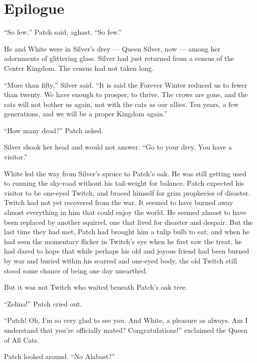 \documentclass[12pt]{memoir}
\begin{document}
\section{Epilogue}

“So few,” Patch said, aghast. “So few.”

He and White were in Silver’s drey — Queen Silver, now — among her
adornments of glittering glass. Silver had just returned from a census
of the Center Kingdom. The census had not taken long.

“More than fifty,” Silver said. “It is said the Forever Winter reduced
us to fewer than twenty. We have enough to prosper, to thrive. The
crows are gone, and the rats will not bother us again, not with the
cats as our allies. Ten years, a few generations, and we will be a
proper Kingdom again.”

“How many dead?” Patch asked.

Silver shook her head and would not answer. “Go to your drey. You have
a visitor.”

White led the way from Silver’s spruce to Patch’s oak. He was still
getting used to running the sky-road without his tail-weight for
balance. Patch expected his visitor to be one-eyed Twitch, and braced
himself for grim prophecies of disaster. Twitch had not yet recovered
from the war. It seemed to have burned away almost everything in him
that could enjoy the world. He seemed almost to have been replaced by
another squirrel, one that lived for disaster and despair. But the
last time they had met, Patch had brought him a tulip bulb to eat; and
when he had seen the momentary flicker in Twitch’s eye when he first
saw the treat, he had dared to hope that while perhaps his old and
joyous friend had been burned by war and buried within his scarred and
one-eyed body, the old Twitch still stood some chance of being one day
unearthed.

But it was not Twitch who waited beneath Patch’s oak tree.

“Zelina!” Patch cried out.

“Patch! Oh, I’m so very glad to see you. And White, a pleasure as
always. Am I understand that you’re officially mated?
Congratulations!” exclaimed the Queen of All Cats.

Patch looked around. “No Alabast?”
\end{document}
